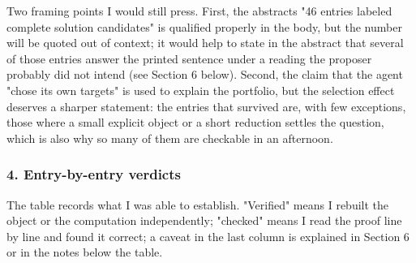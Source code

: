 Two framing points I would still press. First, the
abstract\textquotesingle s "46 entries labeled complete solution
candidates" is qualified properly in the body, but the number will be
quoted out of context; it would help to state in the abstract that
several of those entries answer the printed sentence under a reading the
proposer probably did not intend (see Section 6 below). Second, the
claim that the agent "chose its own targets" is used to explain the
portfolio, but the selection effect deserves a sharper statement: the
entries that survived are, with few exceptions, those where a small
explicit object or a short reduction settles the question, which is also
why so many of them are checkable in an afternoon.

\hypertarget{review-md-entry-by-entry-verdicts}{%
\subsubsection*{4. Entry-by-entry
verdicts}\label{review-md-entry-by-entry-verdicts}}

The table records what I was able to establish. "Verified" means I
rebuilt the object or the computation independently; "checked" means I
read the proof line by line and found it correct; a caveat in the last
column is explained in Section 6 or in the notes below the table.

